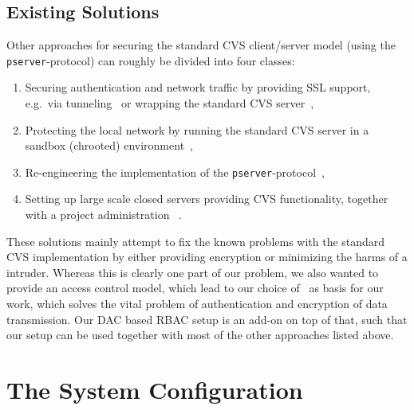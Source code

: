 \subsection{Existing Solutions}
Other approaches for securing the standard CVS client/server model (using the
\texttt{pserver}-protocol) can roughly be divided into four classes:
\begin{enumerate}
\item Securing authentication and network traffic by providing SSL
  support, e.g.\ via tunneling~\cite{berezin:tunnel:2001} or wrapping
  the standard CVS server~\cite{vogt:cvsauth:2001},
\item Protecting the local network by running the standard CVS server in a
  sandbox (chrooted) environment~\cite{hess:anonymous:2001,idealx:chroot:2001},
\item Re-engineering the implementation of the
  \texttt{pserver}-protocol~\cite{nserver},
\item Setting up large scale closed servers providing CVS functionality, together with
  a project administration ~\cite{fsf:savannah:2001,osdn:sourceforge:2001}.
\end{enumerate}
These solutions mainly attempt to fix the known problems with the standard
CVS implementation by either providing encryption or minimizing the harms of a
intruder.  Whereas this is clearly one part of our problem, we also wanted to
provide an access control model, which lead to our choice
of~\cite{vogt:cvsauth:2001} as basis for our work, which solves the vital
problem of authentication and encryption of data transmission. Our DAC based
RBAC setup is an add-on on top of that, such that our setup can be used
together with most of the other approaches listed above.

\section{The System Configuration}
